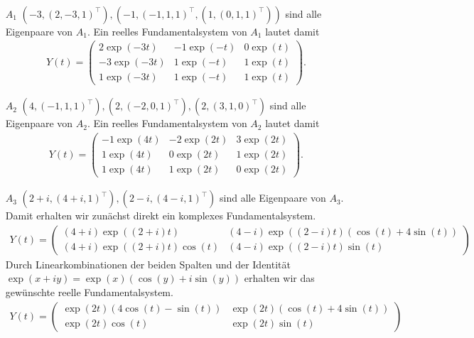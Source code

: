 \begin{solution}
\leavevmode \\
\begin{itemize}
  \item [$A_1$]
  $(-3,(2,-3,1)^{\top}),(-1,(-1,1,1)^{\top},(1,(0,1,1)^{\top}))$ sind alle
  Eigenpaare von $A_1$.
  Ein reelles Fundamentalsystem von $A_1$ lautet damit
  \begin{align*}
    Y(t) = \begin{pmatrix}
      2\exp(-3t) & -1\exp(-t) & 0\exp(t) \\
      -3\exp(-3t) & 1\exp(-t) & 1\exp(t) \\
      1\exp(-3t) & 1\exp(-t) & 1\exp(t)
    \end{pmatrix}.
  \end{align*}
  \item [$A_2$]
  $(4,(-1,1,1)^{\top}),(2,(-2,0,1)^{\top}),(2,(3,1,0)^{\top})$
  sind alle Eigenpaare von $A_2$.
  Ein reelles Fundamentalsystem von $A_2$ lautet damit
  \begin{align*}
    Y(t) = \begin{pmatrix}
    -1\exp(4t) & -2\exp(2t) & 3\exp(2t) \\
    1\exp(4t) & 0\exp(2t) & 1\exp(2t) \\
    1\exp(4t) & 1\exp(2t) & 0\exp(2t)
    \end{pmatrix}.
  \end{align*}
  \item [$A_3$]
  $(2 + i,(4+i,1)^{\top}),(2-i,(4-i,1)^{\top})$ sind alle Eigenpaare von $A_3$.
  Damit erhalten wir zunächst direkt ein komplexes Fundamentalsystem.
  \begin{align*}
  Y(t) = \begin{pmatrix}
    (4+i)\exp((2+i)t)  & (4-i)\exp((2-i)t)(\cos(t) + 4\sin(t)) \\
    (4+i)\exp((2+i)t)\cos(t) & (4-i)\exp((2-i)t)\sin(t)
  \end{pmatrix}
  \end{align*}
  Durch Linearkombinationen der beiden Spalten und der Identität
  $\exp(x + iy) = \exp(x)(\cos(y) + i\sin(y))$ erhalten wir das gewünschte reelle
  Fundamentalsystem.
  \begin{align*}
    Y(t) = \begin{pmatrix}
      \exp(2t)(4\cos(t) -\sin(t))  & \exp(2t)(\cos(t) + 4\sin(t)) \\
      \exp(2t)\cos(t) & \exp(2t)\sin(t)
    \end{pmatrix}
  \end{align*}
\end{itemize}


\end{solution}
